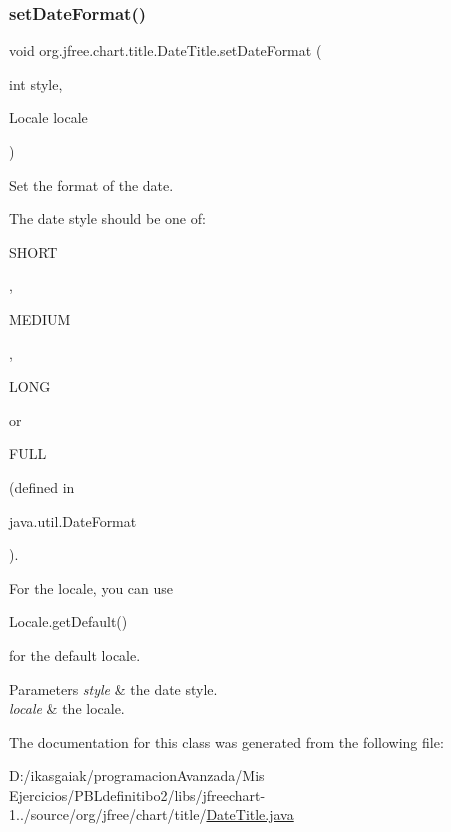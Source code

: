 \subsubsection{\texorpdfstring{set\+Date\+Format()}{setDateFormat()}}
{\footnotesize\ttfamily void org.\+jfree.\+chart.\+title.\+Date\+Title.\+set\+Date\+Format (\begin{DoxyParamCaption}\item[{int}]{style,  }\item[{Locale}]{locale }\end{DoxyParamCaption})}

Set the format of the date. 

The date style should be one of\+:
\begin{DoxyCode}
SHORT 
\end{DoxyCode}
 , 
\begin{DoxyCode}
MEDIUM 
\end{DoxyCode}
 ,
\begin{DoxyCode}
LONG 
\end{DoxyCode}
 or
\begin{DoxyCode}
FULL 
\end{DoxyCode}
 (defined in
\begin{DoxyCode}
java.util.DateFormat 
\end{DoxyCode}
 ). 

For the locale, you can use
\begin{DoxyCode}
Locale.getDefault() 
\end{DoxyCode}
 for the default locale.


\begin{DoxyParams}{Parameters}
{\em style} & the date style. \\
\hline
{\em locale} & the locale. \\
\hline
\end{DoxyParams}


The documentation for this class was generated from the following file\+:\begin{DoxyCompactItemize}
\item 
D\+:/ikasgaiak/programacion\+Avanzada/\+Mis Ejercicios/\+P\+B\+Ldefinitibo2/libs/jfreechart-\/1../source/org/jfree/chart/title/\mbox{\hyperlink{_date_title_8java}{Date\+Title.\+java}}\end{DoxyCompactItemize}
